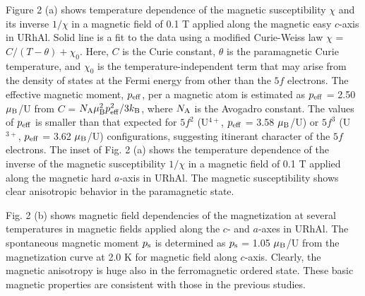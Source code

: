 \documentclass[twocolumn,showpacs,preprintnumbers,amsmath,amssymb]{revtex4}
\begin{document}
 Figure 2 (a) shows temperature dependence of the magnetic susceptibility ${\chi}$ and its inverse $1/{\chi}$ in a magnetic field of 0.1 T applied along the magnetic easy $c$-axis in URhAl. Solid line is a fit to the data using a modified Curie-Weiss law ${\chi}$ = ${C/(T-{\theta})}+ {{\chi}_0}$. Here, $C$ is the Curie constant, $\theta$ is the paramagnetic Curie temperature, and $ {{\chi}_0}$ is the temperature-independent term that may arise from the density of states at the Fermi energy from other than the $5f$ electrons. The effective magnetic moment, $p_{\rm eff}$, per a magnetic atom is estimated as $p_{\rm eff}$ = 2.50 ${\mu}_{\rm B}$/U from $C$ = ${N_{\rm A}}{{\mu}_{\rm B}^2}{p_{\rm eff}^2}/3{k_{\rm B}}$, where $N_{\rm A}$ is the Avogadro constant. The values of $p_{\rm eff}$ is smaller than that expected for $5f^2$ (U$^{4+}$, $p_{\rm eff}$ = 3.58 ${\mu}_{\rm B}$/U) or $5f^3$ (U$^{3+}$, $p_{\rm eff}$ = 3.62 ${\mu}_{\rm B}$/U) configurations, suggesting itinerant character of the $5f$ electrons. The inset of Fig. 2 (a) shows the temperature dependence of the inverse of the magnetic susceptibility $1/{\chi}$ in a magnetic field of 0.1 T applied along the magnetic hard $a$-axis in URhAl. The magnetic susceptibility shows clear anisotropic behavior in the paramagnetic state.
 
 Fig. 2 (b) shows magnetic field dependencies of the magnetization at several temperatures in magnetic fields applied along the $c$- and $a$-axes in URhAl. The spontaneous magnetic moment $p_{\rm s}$ is determined as $p_{\rm s}$ = 1.05 ${\mu}_{\rm B}$/U from the magnetization curve at 2.0 K for magnetic field along $c$-axis. Clearly, the magnetic anisotropy is huge also in the ferromagnetic ordered state. These basic magnetic properties are consistent with those in the previous studies\cite{sechovsky,veenhuizen}.
\end{document}
